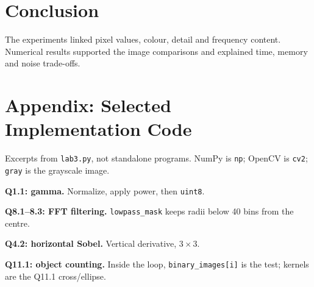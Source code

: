 \documentclass[10pt,a4paper]{article}
\begin{document}
\section{Conclusion}
The experiments linked pixel values, colour, detail and frequency content.
Numerical results supported the image comparisons and explained time, memory
and noise trade-offs.

\section*{Appendix: Selected Implementation Code}
Excerpts from \texttt{lab3.py}, not standalone programs. NumPy is \texttt{np};
OpenCV is \texttt{cv2}; \texttt{gray} is the grayscale image.

\begin{minipage}[t]{0.49\linewidth}\vspace{0pt}\raggedright
\textbf{Q1.1: gamma.} Normalize, apply power, then \texttt{uint8}.

\textbf{Q8.1--8.3: FFT filtering.} \texttt{lowpass\_mask} keeps radii below 40 bins from the centre.

\end{minipage}\hfill
\begin{minipage}[t]{0.49\linewidth}\vspace{0pt}\raggedright
\textbf{Q4.2: horizontal Sobel.} Vertical derivative, \(3\times3\).

\textbf{Q11.1: object counting.} Inside the loop, \texttt{binary\_images[i]} is the test; kernels are the Q11.1 cross/ellipse.

\end{minipage}
\end{document}
